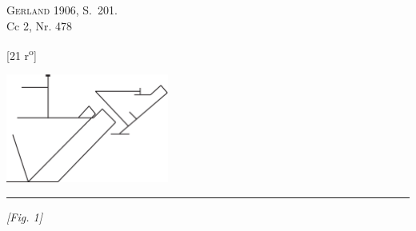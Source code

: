                             \begin{ledgroupsized}[r]{114mm}
                            \footnotesize 
                            \pstart \parindent -6mm
                            \cite{00243}\textsc{Gerland} 1906, S.~201.\\Cc 2, Nr. 478 \pend
                            \end{ledgroupsized}
                \vspace*{8mm}
                \pstart 
                \normalsize
            \begin{center}[21 r\textsuperscript{o}]  \end{center} \pend
              \vspace{5mm}
              \includegraphics[width=0.4\textwidth]{images/38_21r}
               \\\rule{25mm}{0mm}\textit{[Fig. 1]}
              \vspace{5mm}
            \pstart\noindent\hangindent=15mm
